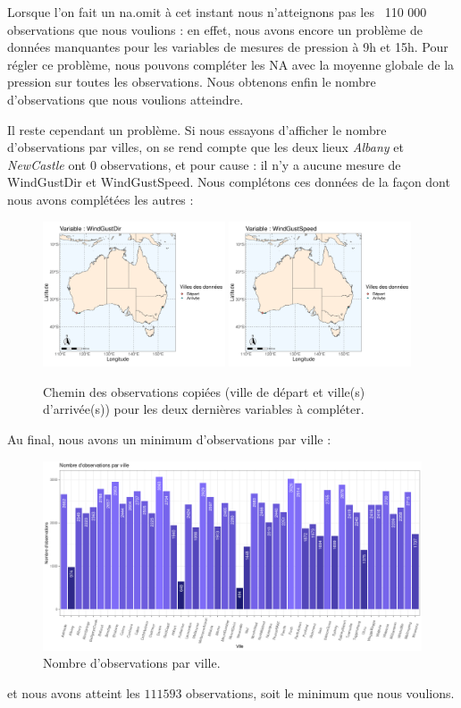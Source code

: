 \documentclass{article}
\begin{document}
Lorsque l'on fait un na.omit à cet instant nous n'atteignons pas les ~110 000 observations que nous voulions : en effet, nous avons encore un problème de données manquantes pour les variables de mesures de pression à 9h et 15h. Pour régler ce problème, nous pouvons compléter les NA avec la moyenne globale de la pression sur toutes les observations. Nous obtenons enfin le nombre d'observations que nous voulions atteindre. 

Il reste cependant un problème. Si nous essayons d'afficher le nombre d'observations par villes, on se rend compte que les deux lieux \emph{Albany} et \emph{NewCastle} ont 0 observations, et pour cause : il n'y a aucune mesure de WindGustDir et WindGustSpeed. Nous complétons ces données de la façon dont nous avons complétées les autres : 

\begin{figure}[H]
    \centering
    \includegraphics[width=0.48\textwidth]{Images/Australia_map_segments_complete/Australia_map_segments_complete-5.jpg}
    \includegraphics[width=0.48\textwidth]{Images/Australia_map_segments_complete/Australia_map_segments_complete-6.jpg}
    \caption{Chemin des observations copiées (ville de départ et ville(s) d'arrivée(s)) pour les deux dernières variables à compléter.}
\end{figure}

Au final, nous avons un minimum d'observations par ville : 

\begin{figure}[H]
    \centering
    \includegraphics[width=\textwidth]{Images/completed_hist_observations_cities.png}
    \caption{Nombre d'observations par ville.}
\end{figure}

et nous avons atteint les $111593$ observations, soit le minimum que nous voulions.

\newpage
\printbibliography
\end{document}
